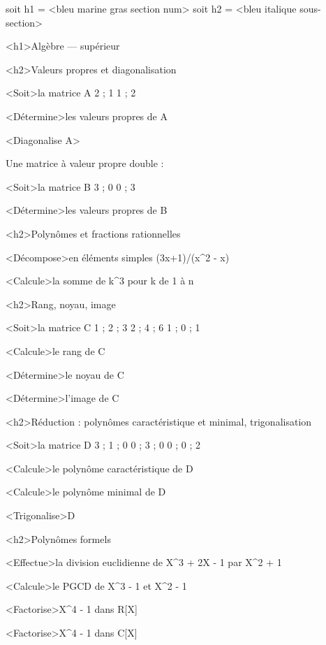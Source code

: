 \documentclass[marges=15, taille=11, precision=3]{texecole}
\begin{document}
soit h1 = <bleu marine gras section num>
soit h2 = <bleu italique sous-section>

<h1>Algèbre — supérieur


<h2>Valeurs propres et diagonalisation

<Soit>la matrice A {
	2 ; 1
	1 ; 2
}

<Détermine>les valeurs propres de A

<Diagonalise A>

Une matrice à valeur propre double :

<Soit>la matrice B {
	3 ; 0
	0 ; 3
}

<Détermine>les valeurs propres de B

<h2>Polynômes et fractions rationnelles

<Décompose>en éléments simples (3x+1)/(x^2 - x)

<Calcule>la somme de k^3 pour k de 1 à n

<h2>Rang, noyau, image

<Soit>la matrice C {
	1 ; 2 ; 3
	2 ; 4 ; 6
	1 ; 0 ; 1
}

<Calcule>le rang de C

<Détermine>le noyau de C

<Détermine>l'image de C

<h2>Réduction : polynômes caractéristique et minimal, trigonalisation

<Soit>la matrice D {
	3 ; 1 ; 0
	0 ; 3 ; 0
	0 ; 0 ; 2
}

<Calcule>le polynôme caractéristique de D

<Calcule>le polynôme minimal de D

<Trigonalise>D

<h2>Polynômes formels

<Effectue>la division euclidienne de X^3 + 2X - 1 par X^2 + 1

<Calcule>le PGCD de X^3 - 1 et X^2 - 1

<Factorise>X^4 - 1 dans R[X]

<Factorise>X^4 - 1 dans C[X]
\end{document}
